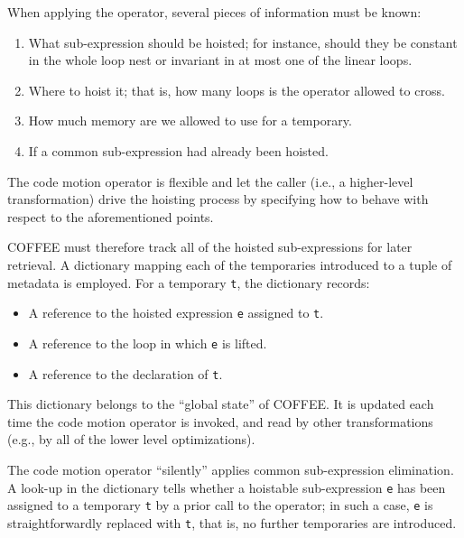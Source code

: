When applying the operator, several pieces of information must be known:
\begin{enumerate}
\item What sub-expression should be hoisted; for instance, should they be constant in the whole loop nest or invariant in at most one of the linear loops.
\item Where to hoist it; that is, how many loops is the operator allowed to cross.
\item How much memory are we allowed to use for a temporary.
\item If a common sub-expression had already been hoisted.
\end{enumerate}
The code motion operator is flexible and let the caller (i.e., a higher-level transformation) drive the hoisting process by specifying how to behave with respect to the aforementioned points.

COFFEE must therefore track all of the hoisted sub-expressions for later retrieval. A dictionary mapping each of the temporaries introduced to a tuple of metadata is employed. For a temporary \texttt{t}, the dictionary records:
\begin{itemize}
\item A reference to the hoisted expression \texttt{e} assigned to \texttt{t}.
\item A reference to the loop in which \texttt{e} is lifted.
\item A reference to the declaration of \texttt{t}.
\end{itemize}
This dictionary belongs to the ``global state'' of COFFEE. It is updated each time the code motion operator is invoked, and read by other transformations (e.g., by all of the lower level optimizations).

The code motion operator ``silently'' applies common sub-expression elimination. A look-up in the dictionary tells whether a hoistable sub-expression \texttt{e} has been assigned to a temporary \texttt{t} by a prior call to the operator; in such a case, \texttt{e} is straightforwardly replaced with \texttt{t}, that is, no further temporaries are introduced. 

%


